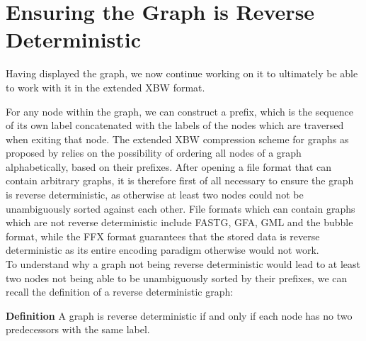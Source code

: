 \documentclass[a4paper,12pt,twoside,BCOR=10mm]{scrbook}
\begin{document}
\section{Ensuring the Graph is Reverse Deterministic}
%

Having displayed the graph, we now continue working on it to ultimately be able 
to work with it in the extended XBW format.

For any node within the graph, we can construct a prefix, 
which is the sequence of its own label concatenated with the labels of the nodes which are 
traversed when exiting that node. 
The extended XBW compression scheme for graphs as proposed by \citet{Siren2014} relies 
on the possibility of ordering all nodes of a graph alphabetically, based on their prefixes. 
After opening a file format that can contain arbitrary graphs, 
it is therefore first of all necessary to ensure the graph is reverse deterministic, 
as otherwise at least two nodes could not be unambiguously sorted against each other. 
File formats which can contain graphs which are not reverse deterministic include 
FASTG, GFA, GML and the bubble format, while the FFX format guarantees that 
the stored data is reverse deterministic as its entire encoding paradigm 
otherwise would not work. \\
To understand why a graph not being reverse deterministic would lead to 
at least two nodes not being able to be unambiguously sorted by their prefixes, 
we can recall the definition of a reverse deterministic graph:

\textbf{Definition} A graph is reverse deterministic if and only if each node has no two predecessors with the same label.
\end{document}
